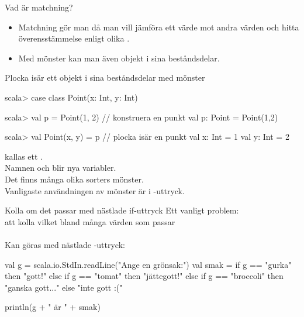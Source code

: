 \begin{Slide}{Vad är matchning?}

  \begin{itemize}
    \item Matchning gör man då man vill jämföra ett värde mot andra värden och hitta överensstämmelse  enligt olika .
    \item Med mönster kan man även  objekt i sina beståndsdelar.
  \end{itemize}
\end{Slide}

\begin{Slide}{Plocka isär ett objekt i sina beståndsdelar med mönster}

\begin{REPLnonum}
scala> case class Point(x: Int, y: Int)

scala> val p = Point(1, 2)      // konstruera en punkt
val p: Point = Point(1,2)
\end{REPLnonum}

\pause 

\begin{REPLnonum}
scala> val Point(x, y) = p      // plocka isär en punkt
val x: Int = 1
val y: Int = 2
\end{REPLnonum}
\pause {} kallas ett .\\ Namnen  och  blir nya variabler.\\ Det finns många olika sorters mönster. \\
Vanligaste användningen av mönster är i -uttryck.
\end{Slide}


\begin{Slide}{Kolla om det passar med nästlade if-uttryck}
Ett vanligt problem: \\ att kolla vilket bland många värden som passar \\~\\

Kan göras med nästlade -uttryck:

\begin{Code}
val g = scala.io.StdIn.readLine("Ange en grönsak:")
val smak =
  if      g == "gurka"    then "gott!"
  else if g == "tomat"    then "jättegott!"
  else if g == "broccoli" then "ganska gott..."
  else "inte gott :("

println(g + " är " + smak)
\end{Code}
      
\end{Slide}


